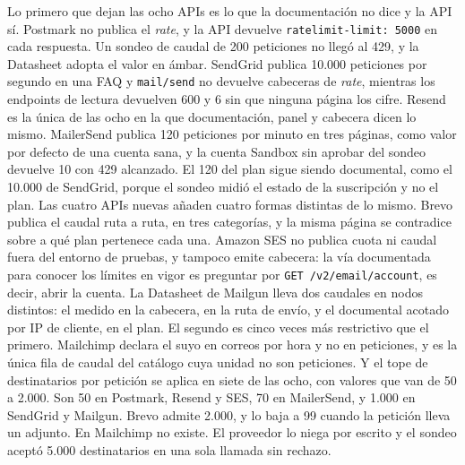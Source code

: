 Lo primero que dejan las ocho APIs es lo que la documentación no dice y la API
sí. Postmark no publica el \textit{rate}, y la API devuelve
\texttt{ratelimit-limit: 5000} en cada respuesta. Un sondeo de caudal de 200
peticiones no llegó al 429, y la Datasheet adopta el valor en
ámbar.
SendGrid publica 10.000 peticiones por segundo en una FAQ y \texttt{mail/send}
no devuelve cabeceras de \textit{rate}, mientras los endpoints de lectura
devuelven 600 y 6 sin que ninguna página los cifre.
Resend es la única de las ocho en la que documentación, panel y cabecera dicen
lo mismo.
MailerSend publica 120 peticiones por minuto en tres páginas, como valor por
defecto de una cuenta sana, y la cuenta Sandbox sin aprobar del sondeo devuelve
10 con 429 alcanzado. El 120 del plan sigue siendo documental, como el 10.000
de SendGrid, porque el sondeo midió el estado de la suscripción y no el plan.
Las cuatro APIs nuevas añaden cuatro formas distintas de lo mismo. Brevo
publica el caudal ruta a ruta, en tres categorías, y la
misma página se contradice sobre a qué plan pertenece cada una.
Amazon SES no publica cuota ni caudal fuera del entorno de pruebas, y tampoco
emite cabecera: la vía documentada para conocer los límites en vigor es
preguntar por \texttt{GET /v2/email/account}, es decir, abrir la cuenta.
La Datasheet de Mailgun lleva dos caudales en nodos distintos: el medido en
la cabecera, en la ruta de envío, y el documental acotado por IP de cliente,
en el plan. El segundo es cinco veces más restrictivo que el primero.
Mailchimp declara el suyo en correos por hora y no en peticiones, y es la única
fila de caudal del catálogo cuya unidad no son peticiones.
Y el tope de destinatarios por petición se aplica en siete de las ocho, con
valores que van de 50 a 2.000. Son 50 en Postmark, Resend y SES, 70 en
MailerSend, y 1.000 en SendGrid y Mailgun. Brevo admite 2.000, y lo baja a 99
cuando la petición lleva un adjunto. En Mailchimp no existe. El proveedor lo niega por
escrito y el sondeo aceptó 5.000 destinatarios en una sola llamada sin rechazo.

